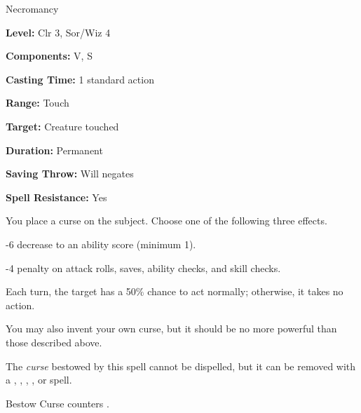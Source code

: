 
Necromancy

\textbf{Level:} Clr 3, Sor/Wiz 4

\textbf{Components:} V, S

\textbf{Casting Time:} 1 standard action

\textbf{Range:} Touch

\textbf{Target:} Creature touched

\textbf{Duration:} Permanent

\textbf{Saving Throw:} Will negates

\textbf{Spell Resistance:} Yes

You place a curse on the subject. Choose one of the following three effects.

\begin{itemize*}
\item -6 decrease to an ability score (minimum 1).
\item -4 penalty on attack rolls, saves, ability checks, and skill checks.
\item Each turn, the target has a 50\% chance to act normally; otherwise, it takes no action.
\end{itemize*}

You may also invent your own curse, but it should be no more powerful than those 
described above.

The \textit{curse} bestowed by this spell cannot be dispelled, but it can be removed 
with a , , , , or  spell.

Bestow Curse counters .

